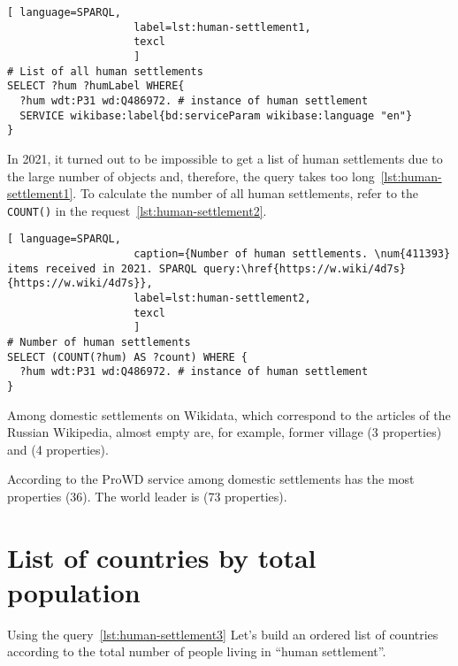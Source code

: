 \begin{lstlisting}[ language=SPARQL, 
                    label=lst:human-settlement1,
                    texcl 
                    ]
# List of all human settlements
SELECT ?hum ?humLabel WHERE{
  ?hum wdt:P31 wd:Q486972. # instance of human settlement
  SERVICE wikibase:label{bd:serviceParam wikibase:language "en"}
}
\end{lstlisting}%

In 2021, it turned out to be impossible to get a list of human settlements
due to the large number of objects and, therefore, the query takes too long~\ref{lst:human-settlement1}.
To calculate the number of all human settlements, refer to the \lstinline|COUNT()|
in the request~\ref{lst:human-settlement2}.

\begin{lstlisting}[ language=SPARQL, 
                    caption={Number of human settlements. \num{411393} items received in 2021. SPARQL query:\href{https://w.wiki/4d7s}{https://w.wiki/4d7s}},
                    label=lst:human-settlement2,
                    texcl 
                    ]
# Number of human settlements
SELECT (COUNT(?hum) AS ?count) WHERE {
  ?hum wdt:P31 wd:Q486972. # instance of human settlement  
}
\end{lstlisting}%

Among domestic settlements on Wikidata,
which correspond to the articles of the Russian Wikipedia,
almost empty are, for example,
former village  (3 properties)
and  (4 properties).

According to the ProWD service
among domestic settlements
 has the most properties (36).
The world leader is  (73 properties).

\section{List of countries by total population}

Using the query~\ref{lst:human-settlement3}
Let's build an ordered list of countries according to the total number of people living in ``human settlement''.

